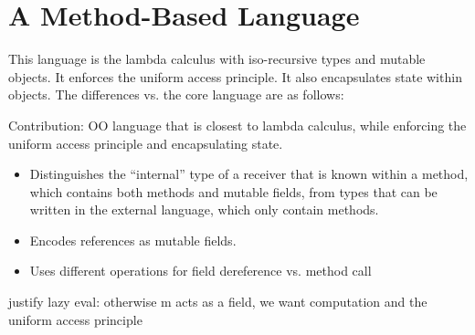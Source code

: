 \section{A Method-Based Language}

This language is the lambda calculus with iso-recursive types and mutable objects.  It enforces the uniform access principle.  It also encapsulates state within objects.  The differences vs. the core language are as follows:

Contribution: OO language that is closest to lambda calculus, while enforcing the uniform access principle and encapsulating state.

\begin{itemize}

 \item Distinguishes the ``internal'' type of a receiver that is known within a method, which contains both methods and mutable fields, from types that can be written in the external language, which only contain methods.
 
 \item Encodes references as mutable fields.
 
 \item Uses different operations for field dereference vs. method call

\end{itemize}

justify lazy eval: otherwise m acts as a field, we want computation and the uniform access principle



